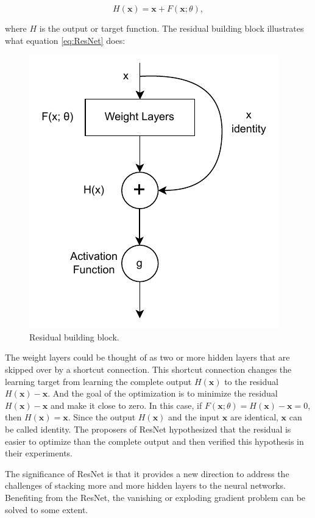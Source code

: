 \documentclass[
	parskip, 			   %
	twoside, 			   %
	DIV=14, 			   %
	BCOR=15.0mm, 		   %
	headsepline, 		   %
	open=right, 		   %
	captions=tableheading, %
	bibliography=totoc,    %
	numbers=noenddot       %
]{scrreprt}
\begin{document}
\begin{equation}
    \label{eq:ResNet}
    H(\mathbf{x})=\mathbf{x}+F(\mathbf{x};\theta),
\end{equation}

where $H$ is the output or target function. The residual building block illustrates what equation \ref{eq:ResNet} does:

\clearpage
\begin{figure}[htbp!]
    \centering
    \includegraphics[scale=1]{figures/ResNet.pdf}
    \caption{Residual building block.}
    \label{fig:ResNet}
\end{figure}

The weight layers could be thought of as two or more hidden layers that are skipped over by a shortcut connection. This shortcut connection changes the learning target from learning the complete output $H(\mathbf{x})$ to the residual $H(\mathbf{x})-\mathbf{x}$. And the goal of the optimization is to minimize the residual $H(\mathbf{x})-\mathbf{x}$ and make it close to zero. In this case, if $F(\mathbf{x};\theta)=H(\mathbf{x})-\mathbf{x}=0$, then $H(\mathbf{x})=\mathbf{x}$. Since the output $H(\mathbf{x})$ and the input $\mathbf{x}$ are identical, $\mathbf{x}$ can be called identity. The proposers of ResNet hypothesized that the residual is easier to optimize than the complete output and then verified this hypothesis in their experiments. 

 The significance of ResNet is that it provides a new direction to address the challenges of stacking more and more hidden layers to the neural networks. Benefiting from the ResNet, the vanishing or exploding gradient problem can be solved to some extent.
\end{document}
